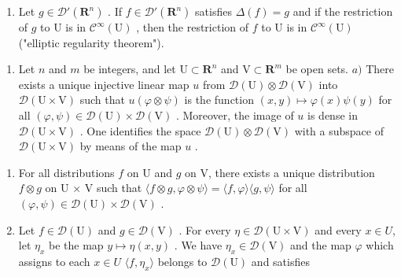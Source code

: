 \begin{enumerate}
\def\labelenumi{\alph{enumi})}
\setcounter{enumi}{7}
\tightlist
\item
  Let \(g \in \mathcal{D}'(\mathbf{R}^n)\) . If \(f \in \mathcal{D}'(\mathbf{R}^n)\) satisfies \(\Delta(f) = g\) and if the restriction of \(g\) to U is in \(\mathcal{C}^\infty(\mathrm{U})\) , then the restriction of \(f\) to U is in \(\mathcal{C}^\infty(\mathrm{U})\) ("elliptic regularity theorem").
\end{enumerate}

\begin{enumerate}
\def\labelenumi{\arabic{enumi})}
\setcounter{enumi}{27}
\tightlist
\item
  Let \(n\) and \(m\) be integers, and let \(\mathrm{U} \subset \mathbf{R}^n\) and \(\mathrm{V} \subset \mathbf{R}^m\) be open sets. \(a)\) There exists a unique injective linear map \(u\) from \(\mathcal{D}(\mathrm{U}) \otimes \mathcal{D}(\mathrm{V})\) into \(\mathcal{D}(\mathrm{U} \times \mathrm{V})\) such that \(u(\varphi \otimes \psi)\) is the function \((x, y) \mapsto \varphi(x)\psi(y)\) for all \((\varphi, \psi) \in \mathcal{D}(\mathrm{U}) \times \mathcal{D}(\mathrm{V})\) . Moreover, the image of \(u\) is dense in \(\mathcal{D}(\mathrm{U} \times \mathrm{V})\) . One identifies the space \(\mathcal{D}(\mathrm{U}) \otimes \mathcal{D}(\mathrm{V})\) with a subspace of \(\mathcal{D}(\mathrm{U} \times \mathrm{V})\) by means of the map \(u\) .
\end{enumerate}

\begin{enumerate}
\def\labelenumi{\alph{enumi})}
\setcounter{enumi}{1}
\item
  For all distributions \(f\) on U and \(g\) on V, there exists a unique distribution \(f \otimes g\) on U × V such that \(\langle f \otimes g, \varphi \otimes \psi \rangle = \langle f, \varphi \rangle \langle g, \psi \rangle\) for all \((\varphi, \psi) \in \mathcal{D}(\mathrm{U}) \times \mathcal{D}(\mathrm{V})\) .
\item
  Let \(f \in \mathcal{D}(\mathrm{U})\) and \(g \in \mathcal{D}(\mathrm{V})\) . For every \(\eta \in \mathcal{D}(\mathrm{U} \times \mathrm{V})\) and every \(x \in U\), let \(\eta_x\) be the map \(y \mapsto \eta(x, y)\) . We have \(\eta_x \in \mathcal{D}(\mathrm{V})\) and the map \(\varphi\) which assigns to each \(x \in U\) \(\langle f, \eta_x \rangle\) belongs to \(\mathcal{D}(\mathrm{U})\) and satisfies
\end{enumerate}

